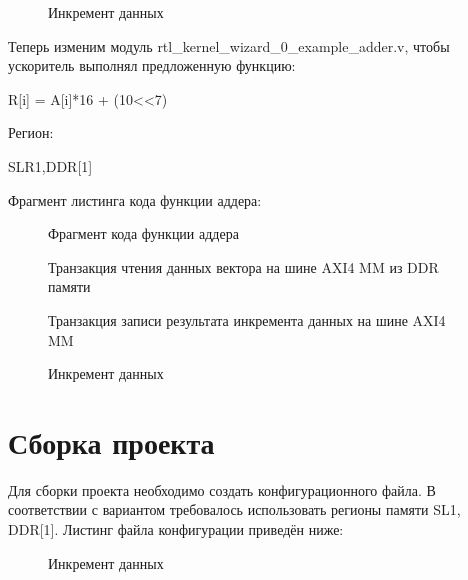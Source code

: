 \newpage

\begin{figure}[ph!]
	\caption{Инкремент данных}
\end{figure}

Теперь изменим модуль rtl\_kernel\_wizard\_0\_example\_adder.v, чтобы ускоритель выполнял предложенную функцию:

R[i] = A[i]*16 + (10<<7)

Регион:

SLR1,DDR[1]

Фрагмент листинга кода функции аддера:

\begin{figure}[ph!]
	\caption{Фрагмент кода функции аддера}
\end{figure}


\begin{figure}[ph!]
	\caption{Транзакция чтения данных вектора на шине AXI4 MM из DDR памяти}
\end{figure}

\begin{figure}[ph!]
	\caption{Транзакция записи результата инкремента данных на шине AXI4 MM}
\end{figure}

\newpage

\begin{figure}[ph!]
	\caption{Инкремент данных}
\end{figure}

\chapter{Сборка проекта}

Для сборки проекта необходимо создать конфигурационного файла. В соответствии с вариантом требовалось использовать регионы памяти SL1, DDR[1]. Листинг файла конфигурации приведён ниже:

\begin{figure}[ph!]
	\caption{Инкремент данных}
\end{figure}

